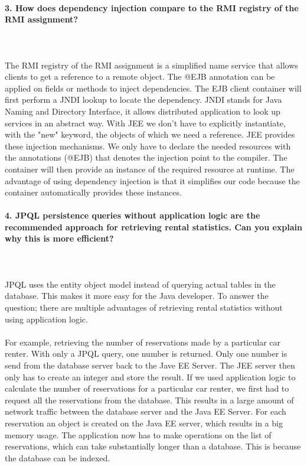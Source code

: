 \documentclass{ds-report}
\begin{document}
	\paragraph{3. How does dependency injection compare to the RMI registry of the RMI assignment?} \mbox{}\\\\
The RMI registry of the RMI assignment is a simplified name service that allows clients to get a reference to a remote object. The @EJB annotation can be applied on fields or methods to inject dependencies. The EJB client container will first perform a JNDI lookup to locate the dependency. JNDI stands for Java Naming and Directory Interface, it allows distributed application to look up services in an abstract way.
With JEE we don't have to explicitly instantiate, with the "new" keyword, the objects of which we need a reference. JEE provides these injection mechanisms. We only have to declare the needed resources with the annotations (@EJB) that denotes the injection point to the compiler. The container will then provide an instance of the required resource at runtime. The advantage of using dependency injection is that it simplifies our code because the container automatically provides these instances.


\clearpage



	\paragraph{4. JPQL persistence queries without application logic are the recommended approach for retrieving rental statistics. Can you explain why this is more efficient?} \mbox{}\\\\
JPQL uses the entity object model instead of querying actual tables in the database. This makes it more easy for the Java developer. To answer the question; there are multiple advantages of retrieving rental statistics without using application logic.\\\\
For example, retrieving the number of reservations made by a particular car renter. With only a JPQL query, one number is returned. Only one number is send from the database server back to the Jave EE Server. The JEE server then only has to create an integer and store the result. If we used application logic to calculate the number of reservations for a particular car renter, we first had to request all the reservations from the database. This results in a large amount of network traffic between the database server and the Java EE Server. For each reservation an object is created on the Java EE server, which results in a big memory usage. The application now has to make operations on the list of reservations, which can take substantially longer than a database. This is because the database can be indexed.
\end{document}
